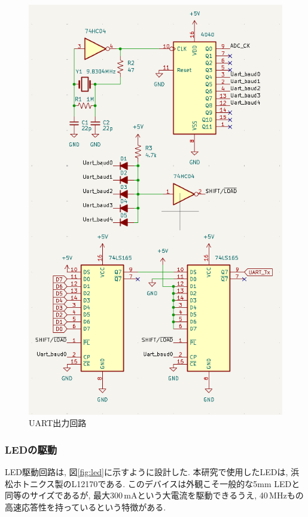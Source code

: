 \documentclass[a4paper,10pt]{article}
\begin{document}
\begin{multicols}{2}[\raggedcolumns]
\begin{figure}[H]
    \centering
    \includegraphics[width=\linewidth]{figure/uart_tx.png} 
    \caption{UART出力回路} 
    \label{fig:uart_tx}
\end{figure}

\subsubsection{LEDの駆動}
LED駆動回路は, 図\ref{fig:led}に示すように設計した.  
本研究で使用したLEDは, 浜松ホトニクス製のL12170である.  
このデバイスは外観こそ一般的な5mm LEDと同等のサイズであるが, 最大300\,mAという大電流を駆動できるうえ, 40\,MHzもの高速応答性を持っているという特徴がある.  


\end{multicols}
\end{document}
